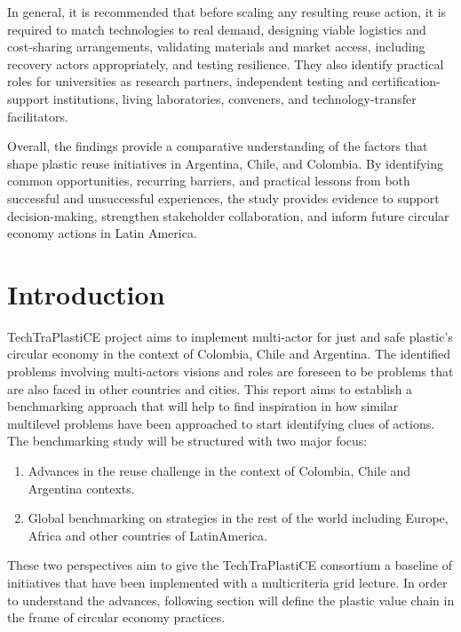 \documentclass[
  12pt,
  oneside]{book}
\providecommand{\tightlist}{%
  \setlength{\itemsep}{0pt}\setlength{\parskip}{0pt}}
\begin{document}
In general, it is recommended that before scaling any resulting reuse
action, it is required to match technologies to real demand, designing
viable logistics and cost-sharing arrangements, validating materials and
market access, including recovery actors appropriately, and testing
resilience. They also identify practical roles for universities as
research partners, independent testing and certification-support
institutions, living laboratories, conveners, and technology-transfer
facilitators.

Overall, the findings provide a comparative understanding of the factors
that shape plastic reuse initiatives in Argentina, Chile, and Colombia.
By identifying common opportunities, recurring barriers, and practical
lessons from both successful and unsuccessful experiences, the study
provides evidence to support decision-making, strengthen stakeholder
collaboration, and inform future circular economy actions in Latin
America.

\chapter{Introduction}\label{introduction}

TechTraPlastiCE project aims to implement multi-actor for just and safe
plastic's circular economy in the context of Colombia, Chile and
Argentina. The identified problems involving multi-actors visions and
roles are foreseen to be problems that are also faced in other countries
and cities. This report aims to establish a benchmarking approach that
will help to find inspiration in how similar multilevel problems have
been approached to start identifying clues of actions. The benchmarking
study will be structured with two major focus:

\begin{enumerate}
\def\labelenumi{\arabic{enumi}.}
\tightlist
\item
  Advances in the reuse challenge in the context of Colombia, Chile and
  Argentina contexts.
\item
  Global benchmarking on strategies in the rest of the world including
  Europe, Africa and other countries of LatinAmerica.
\end{enumerate}

These two perspectives aim to give the TechTraPlastiCE consortium a
baseline of initiatives that have been implemented with a multicriteria
grid lecture. In order to understand the advances, following section
will define the plastic value chain in the frame of circular economy
practices.
\end{document}
